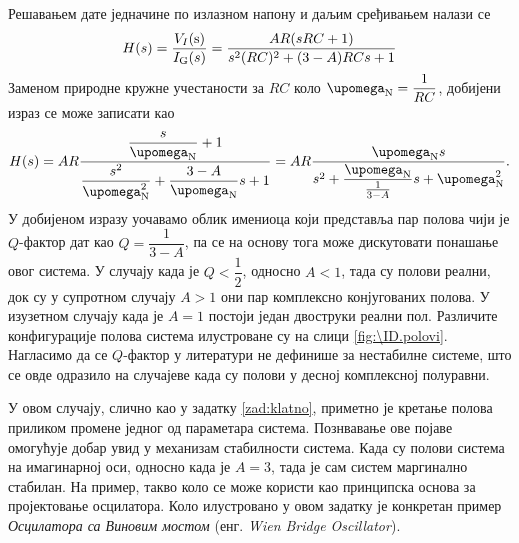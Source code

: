 %
Решавањем дате једначине по излазном напону и даљим сређивањем налази се 
\begin{equation}
    H(s) = \dfrac{V_I(\rm s)}{I_{\rm G}(s)} = 
    \dfrac{AR(sRC + 1)}{ s^2(RC)^2 + (3-A)RCs + 1 }
\end{equation}
Заменом природне кружне учестаности за $RC$ коло $\upomega_{\rm N} = \dfrac{1}{RC}$, добијени израз се може 
записати као 
\begin{equation}
    H(s) = AR \dfrac{ \dfrac{s}{\upomega_{\rm N}} + 1}{ \dfrac{s^2}{\upomega_{\rm N}^2} + \dfrac{3 - A}{\upomega_{\rm N}}s + 1  }
    = AR 
    \dfrac{\upomega_{\rm N} s }{s^2 + \dfrac{\upomega_{\rm N}}{\frac{1}{3-A} }s + \upomega_{\rm N}^2  }.
\end{equation}
У добијеном изразу уочавамо облик имениоца који представља пар полова чији је $Q$-фактор дат као $Q = \dfrac{1}{3-A}$, па се на основу тога 
може дискутовати понашање овог система. У случају када је $Q < \dfrac{1}{2}$, односно $A < 1$, тада су полови реални, док су у супротном
случају $A > 1$ они пар комплексно конјугованих полова. У изузетном случају када је $A = 1$ постоји један двоструки реални пол. 
Различите конфигурације полова система илустроване су на слици \ref{fig:\ID.polovi}. Нагласимо да се $Q$-фактор у литератури
не дефинише за нестабилне системе, што се овде одразило на случајеве када су полови у десној комплексној полуравни. 

У овом случају, слично као у задатку \ref{zad:klatno}, приметно је кретање полова приликом промене једног од параметара
система. Познвавање ове појаве омогућује добар увид у механизам стабилности система. Када су полови система на имагинарној
оси, односно када је $A = 3$, тада је сам систем маргинално стабилан. На пример, такво коло се може користи као принципска
основа за пројектовање осцилатора. Коло илустровано у овом задатку је конкретан пример 
\textit{Осцилатора са Виновим мостом} (енг. \textit{Wien Bridge Oscillator}).


